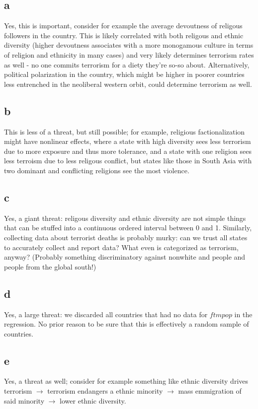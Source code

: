 \documentclass[12pt,letterpaper]{article}
\theoremstyle{definition}
\begin{document}
\subsection*{a}

Yes, this is important, consider for example the average devoutness of religous followers in the country. This is likely correlated with both religous and ethnic diversity (higher devoutness associates with a more monogamous culture in terms of religion and ethnicity in many cases) and very likely determines terrorism rates as well - no one commits terrorism for a diety they're so-so about. Alternatively, political polarization in the country, which might be higher in poorer countries less entrenched in the neoliberal western orbit, could determine terrorism as well.

\subsection*{b}

This is less of a threat, but still possible; for example, religious factionalization might have nonlinear effects, where a state with high diversity sees less terrorism due to more exposure and thus more tolerance, and a state with one religion sees less terroism due to less religous conflict, but states like those in South Asia with two dominant and conflicting religions see the most violence.

\subsection*{c}

Yes, a giant threat: religous diversity and ethnic diversity are not simple things that can be stuffed into a continuous ordered interval between 0 and 1. Similarly, collecting data about terrorist deaths is probably murky: can we trust all states to accurately collect and report data? What even is categorized as terrorism, anyway? (Probably something discriminatory against nonwhite and people and people from the global south!)

\subsection*{d}

Yes, a large threat: we discarded all countries that had no data for $ftmpop$ in the regression. No prior reason to be sure that this is effectively a random sample of countries.

\subsection*{e}

Yes, a threat as well; consider for example something like ethnic diversity drives terrorism $\rightarrow$ terrorism endangers a ethnic minority $\rightarrow$ mass emmigration of said minority $\rightarrow$ lower ethnic diversity.
\end{document}
